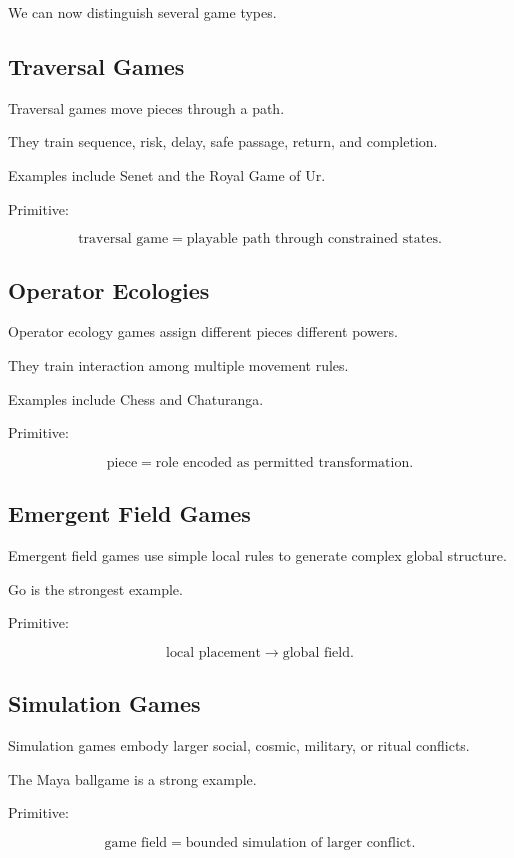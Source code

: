 \documentclass[11pt]{book}
\begin{document}
We can now distinguish several game types.

\subsection{Traversal Games}

Traversal games move pieces through a path.

They train sequence, risk, delay, safe passage, return, and completion.

Examples include Senet and the Royal Game of Ur.

Primitive:

\[
\text{traversal game} = \text{playable path through constrained states}.
\]

\subsection{Operator Ecologies}

Operator ecology games assign different pieces different powers.

They train interaction among multiple movement rules.

Examples include Chess and Chaturanga.

Primitive:

\[
\text{piece} = \text{role encoded as permitted transformation}.
\]

\subsection{Emergent Field Games}

Emergent field games use simple local rules to generate complex global structure.

Go is the strongest example.

Primitive:

\[
\text{local placement} \rightarrow \text{global field}.
\]

\subsection{Simulation Games}

Simulation games embody larger social, cosmic, military, or ritual conflicts.

The Maya ballgame is a strong example.

Primitive:

\[
\text{game field} = \text{bounded simulation of larger conflict}.
\]
\end{document}
